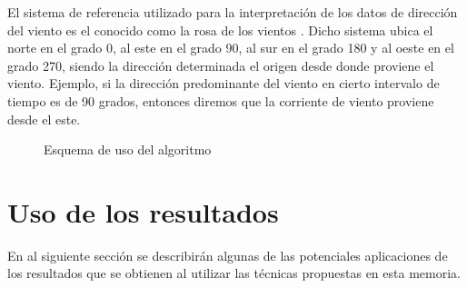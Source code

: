 El sistema de referencia utilizado para la interpretación de los datos de dirección del viento es el conocido como la rosa de los vientos \cite{RosaViento}. Dicho sistema ubica el norte en el grado 0, al este en el grado 90, al sur en el grado 180 y al oeste en el grado 270, siendo la dirección determinada el origen desde donde proviene el viento. Ejemplo, si la dirección predominante del viento en cierto intervalo de tiempo es de 90 grados, entonces diremos que la corriente de viento proviene desde el este.

\begin{figure}[ht!]
\caption{Esquema de uso del algoritmo}

\label{esq:PSO_ALG}
\end{figure}

\section{Uso de los resultados}
En al siguiente sección se describirán algunas de las potenciales aplicaciones de los resultados que se obtienen al utilizar las técnicas propuestas en esta memoria.
